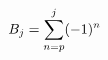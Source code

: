 \documentclass[preview]{standalone}
\begin{document}
\begin{align*}
\special{dvisvgm:raw <g id='unique000'>}B_j=\sum_{n=p}^j(-1)^n\special{dvisvgm:raw </g>}
\end{align*}
\end{document}
